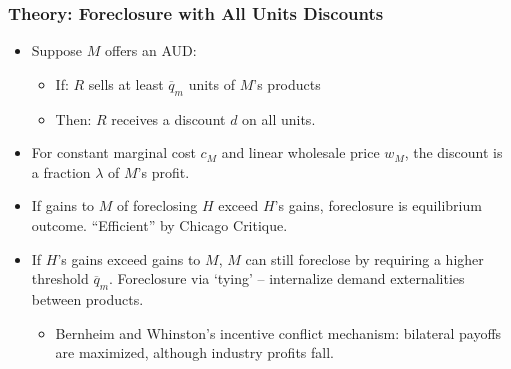 \documentclass[aspectratio=169,11pt]{beamer}
\begin{document}
\begin{frame}
\frametitle{Theory: Foreclosure with All Units Discounts}
\begin{itemize}
\item Suppose $M$ offers an AUD:
	\begin{itemize}
	\item If: $R$ sells at least $\overline{q}_m$ units of $M$'s products 
	\item Then: $R$ receives a discount $d$ on all units.
	\end{itemize}
\item For constant marginal cost $c_M$ and linear wholesale price $w_M$, the discount is a fraction $\lambda$ of $M$'s profit.
	\item If gains to $M$ of foreclosing $H$ exceed $H$'s gains, foreclosure is equilibrium outcome. ``Efficient'' by Chicago Critique.
	\item If $H$'s gains exceed gains to $M$, $M$ can still foreclose by requiring a higher threshold $\overline{q}_m$. Foreclosure via `tying' -- internalize demand externalities between products.
	\begin{itemize}
	\item Bernheim and Whinston's incentive conflict mechanism: bilateral payoffs are maximized, although industry profits fall.
	\end{itemize}
\end{itemize}
\hyperlink{supplemental}{}
\end{frame}
\end{document}
